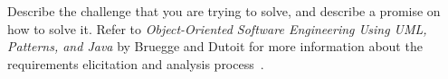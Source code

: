 \begin{tcolorbox}
	Describe the challenge that you are trying to solve, and describe a promise on how to solve it.
	Refer to \textit{Object-Oriented Software Engineering Using UML, Patterns, and Java} by Bruegge and Dutoit for more information about the requirements elicitation and analysis process~\cite{bruegge2013object}.

\end{tcolorbox}
